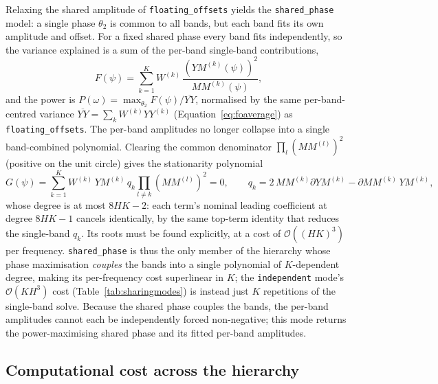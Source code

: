 \documentclass[apj]{emulateapj}
\newcommand{\bigO}{\mathcal{O}}
\newcommand{\bandavg}[1]{\overline{#1}}
\newcommand{\Wtk}[1][k]{W^{(#1)}}
\newcommand{\eith}{\psi}
\begin{document}
\begin{appendix}
Relaxing the shared amplitude of \texttt{floating\_offsets} yields the \texttt{shared\_phase} model: a single phase $\theta_2$ is common to all bands, but each band fits its own amplitude and offset. For a fixed shared phase every band fits independently, so the variance explained is a sum of the per-band single-band contributions,
\begin{equation}
F(\eith) = \sum_{k=1}^K \Wtk\,\frac{\left(YM^{(k)}(\eith)\right)^2}{MM^{(k)}(\eith)},
\end{equation}
and the power is $P(\omega) = \max_{\theta_2} F(\eith)/\bandavg{YY}$, normalised by the same per-band-centred variance $\bandavg{YY} = \sum_k \Wtk YY^{(k)}$ (Equation~\ref{eq:foaverage}) as \texttt{floating\_offsets}.
The per-band amplitudes no longer collapse into a single band-combined polynomial. Clearing the common denominator $\prod_l\left(MM^{(l)}\right)^2$ (positive on the unit circle) gives the stationarity polynomial
\begin{equation}
G(\eith) = \sum_{k=1}^K \Wtk\, YM^{(k)}\, q_k \prod_{l\ne k}\left(MM^{(l)}\right)^2 = 0, \qquad q_k = 2\,MM^{(k)}\partial YM^{(k)} - \partial MM^{(k)}\,YM^{(k)},
\end{equation}
whose degree is at most $8HK-2$: each term's nominal leading coefficient at degree $8HK-1$ cancels identically, by the same top-term identity that reduces the single-band $q_k$. Its roots must be found explicitly, at a cost of $\bigO((HK)^3)$ per frequency. \texttt{shared\_phase} is thus the only member of the hierarchy whose phase maximisation \emph{couples} the bands into a single polynomial of $K$-dependent degree, making its per-frequency cost superlinear in $K$; the \texttt{independent} mode's $\bigO(KH^3)$ cost (Table~\ref{tab:sharingmodes}) is instead just $K$ repetitions of the single-band solve. Because the shared phase couples the bands, the per-band amplitudes cannot each be independently forced non-negative; this mode returns the power-maximising shared phase and its fitted per-band amplitudes.

\subsection{Computational cost across the hierarchy}
\label{app:mbcost}


\end{appendix}
\end{document}
